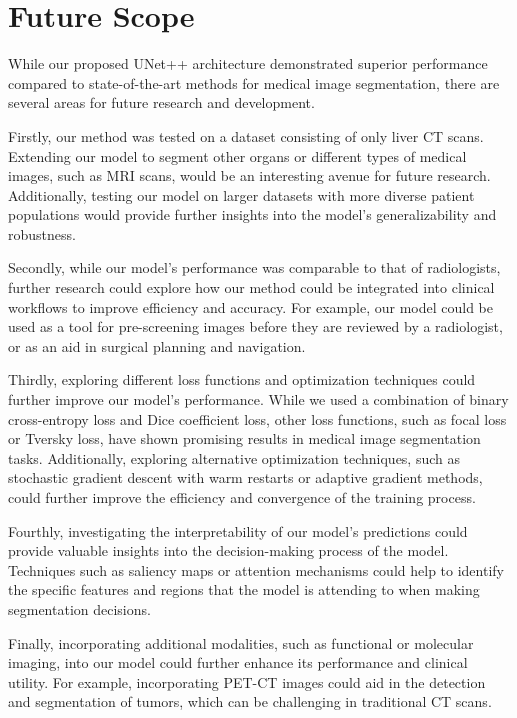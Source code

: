 \documentclass[conference]{IEEEtran}
\begin{document}
\section{Future Scope}
While our proposed UNet++ architecture demonstrated superior performance compared to state-of-the-art methods for medical image segmentation, there are several areas for future research and development.

Firstly, our method was tested on a dataset consisting of only liver CT scans. Extending our model to segment other organs or different types of medical images, such as MRI scans, would be an interesting avenue for future research. Additionally, testing our model on larger datasets with more diverse patient populations would provide further insights into the model's generalizability and robustness.

Secondly, while our model's performance was comparable to that of radiologists, further research could explore how our method could be integrated into clinical workflows to improve efficiency and accuracy. For example, our model could be used as a tool for pre-screening images before they are reviewed by a radiologist, or as an aid in surgical planning and navigation.

Thirdly, exploring different loss functions and optimization techniques could further improve our model's performance. While we used a combination of binary cross-entropy loss and Dice coefficient loss, other loss functions, such as focal loss or Tversky loss, have shown promising results in medical image segmentation tasks. Additionally, exploring alternative optimization techniques, such as stochastic gradient descent with warm restarts or adaptive gradient methods, could further improve the efficiency and convergence of the training process.

Fourthly, investigating the interpretability of our model's predictions could provide valuable insights into the decision-making process of the model. Techniques such as saliency maps or attention mechanisms could help to identify the specific features and regions that the model is attending to when making segmentation decisions.

Finally, incorporating additional modalities, such as functional or molecular imaging, into our model could further enhance its performance and clinical utility. For example, incorporating PET-CT images could aid in the detection and segmentation of tumors, which can be challenging in traditional CT scans.
\end{document}
